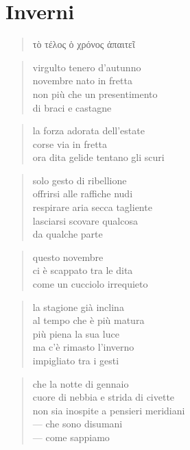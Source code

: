 \chapter*{Inverni}

\begin{verse}
    \begin{otherlanguage}{greek}
        τὸ τέλος ὁ χρόνος ἀπαιτεῖ
    \end{otherlanguage}
\end{verse}


\begin{verse}
    virgulto tenero d’autunno\\
    novembre nato in fretta\\
    non più che un presentimento\\
    di braci e castagne
\end{verse}

\begin{verse}
    la forza adorata dell’estate\\
    corse via in fretta\\
    ora dita gelide tentano gli scuri
\end{verse}

\clearpage


\begin{verse}
    solo gesto di ribellione\\
    offrirsi alle raffiche nudi\\
    respirare aria secca tagliente\\
    lasciarsi scovare qualcosa\\
    da qualche parte
\end{verse}

\clearpage


\begin{verse}
    questo novembre\\
    ci è scappato tra le dita\\
    come un cucciolo irrequieto
\end{verse}

\clearpage


\begin{verse}
    la stagione già inclina\\
    al tempo che è più matura\\
    più piena la sua luce\\
    ma c’è rimasto l’inverno\\
    impigliato tra i gesti
\end{verse}

\clearpage


\begin{verse}
    che la notte di gennaio\\
    cuore di nebbia e strida di civette\\
    non sia inospite a pensieri meridiani\\
    — che sono disumani\\
    — come sappiamo
\end{verse}
